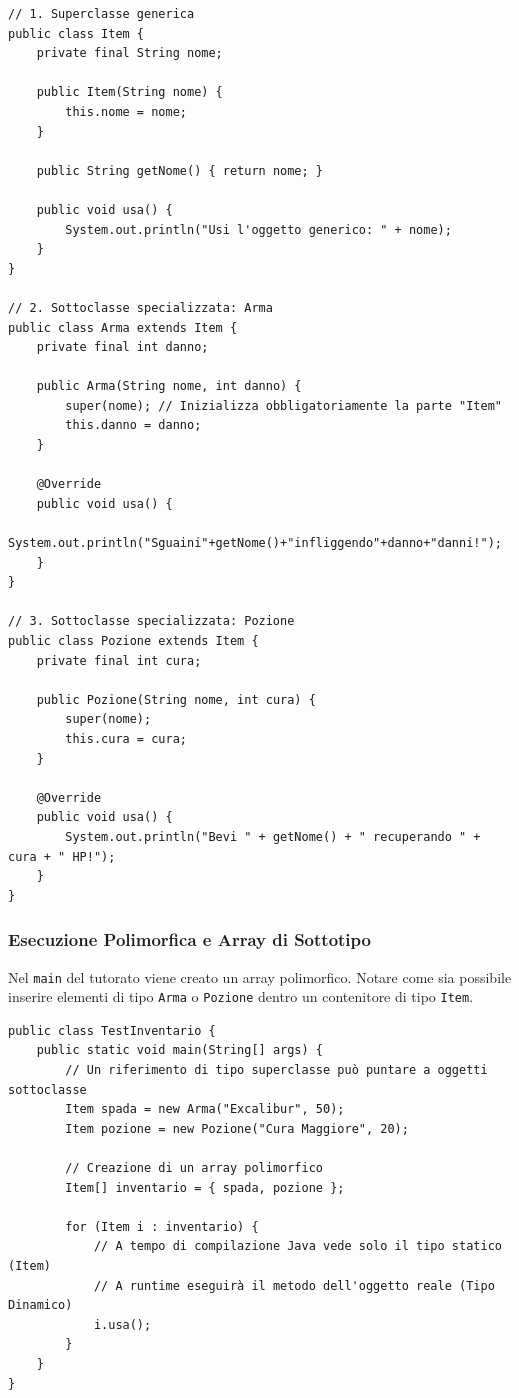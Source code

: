 \documentclass[12pt, a4paper]{article}
\begin{document}
\begin{verbatim}
// 1. Superclasse generica
public class Item {
    private final String nome;

    public Item(String nome) {
        this.nome = nome;
    }

    public String getNome() { return nome; }

    public void usa() {
        System.out.println("Usi l'oggetto generico: " + nome);
    }
}

// 2. Sottoclasse specializzata: Arma
public class Arma extends Item {
    private final int danno;

    public Arma(String nome, int danno) {
        super(nome); // Inizializza obbligatoriamente la parte "Item"
        this.danno = danno;
    }

    @Override
    public void usa() {
        System.out.println("Sguaini"+getNome()+"infliggendo"+danno+"danni!");
    }
}

// 3. Sottoclasse specializzata: Pozione
public class Pozione extends Item {
    private final int cura;

    public Pozione(String nome, int cura) {
        super(nome);
        this.cura = cura;
    }

    @Override
    public void usa() {
        System.out.println("Bevi " + getNome() + " recuperando " + cura + " HP!");
    }
}
\end{verbatim}

\newpage

\subsubsection{Esecuzione Polimorfica e Array di Sottotipo}
Nel \texttt{main} del tutorato viene creato un array polimorfico. Notare come sia possibile inserire elementi di tipo \texttt{Arma} o \texttt{Pozione} dentro un contenitore di tipo \texttt{Item}.

\begin{verbatim}
public class TestInventario {
    public static void main(String[] args) {
        // Un riferimento di tipo superclasse può puntare a oggetti sottoclasse
        Item spada = new Arma("Excalibur", 50); 
        Item pozione = new Pozione("Cura Maggiore", 20); 

        // Creazione di un array polimorfico
        Item[] inventario = { spada, pozione }; 

        for (Item i : inventario) {
            // A tempo di compilazione Java vede solo il tipo statico (Item)
            // A runtime eseguirà il metodo dell'oggetto reale (Tipo Dinamico)
            i.usa(); 
        }
    }
}
\end{verbatim}
\end{document}

